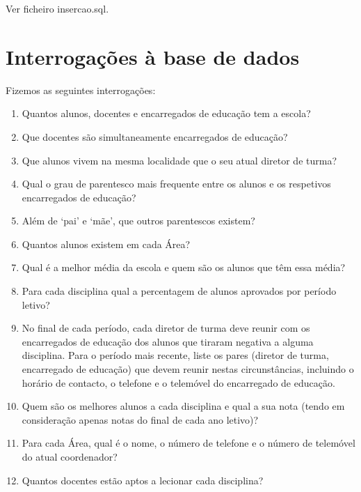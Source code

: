 \documentclass[12pt,a4paper,reqno]{report}
\numberwithin{figure}{section}
\numberwithin{equation}{section}
\begin{document}
Ver ficheiro insercao.sql.

\chapter{Interrogações à base de dados}

Fizemos as seguintes interrogações:

\begin{enumerate}
	
	\item Quantos alunos, docentes e encarregados de educação tem a escola?
	
	\item Que docentes são simultaneamente encarregados de educação?
	
	\item Que alunos vivem na mesma localidade que o seu atual diretor de turma?
	
	\item Qual o grau de parentesco mais frequente entre os alunos e os respetivos encarregados de educação?
	
	\item Além de `pai' e `mãe', que outros parentescos existem?
	
	\item Quantos alunos existem em cada Área?
	
	\item Qual é a melhor média da escola e quem são os alunos que têm essa média?
	
	\item Para cada disciplina qual a percentagem de alunos aprovados por período letivo?
	
	\item No final de cada período, cada diretor de turma deve reunir com os encarregados de educação dos alunos que tiraram negativa a alguma disciplina. Para o período mais recente, liste os pares (diretor de turma, encarregado de educação) que devem reunir nestas circunstâncias, incluindo o horário de contacto, o telefone e o telemóvel do encarregado de educação.
	
	\item Quem são os melhores alunos a cada disciplina e qual a sua nota (tendo em consideração apenas notas do final de cada ano letivo)?
	
	\item Para cada Área, qual é o nome, o número de telefone e o número de telemóvel do atual coordenador?
	
	\item Quantos docentes estão aptos a lecionar cada disciplina?
	

\end{enumerate}
\end{document}
